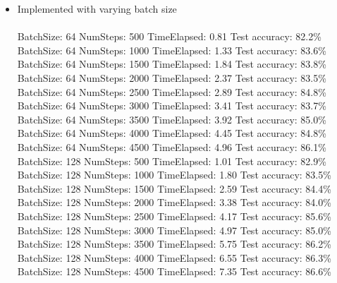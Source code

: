 \documentclass{article}
\begin{document}
\begin{itemize}
	\item Implemented with varying batch size \\ \\

BatchSize: 64 NumSteps: 500 TimeElapsed: 0.81 Test accuracy: 82.2\% \\
BatchSize: 64 NumSteps: 1000 TimeElapsed: 1.33 Test accuracy: 83.6\% \\
BatchSize: 64 NumSteps: 1500 TimeElapsed: 1.84 Test accuracy: 83.8\% \\
BatchSize: 64 NumSteps: 2000 TimeElapsed: 2.37 Test accuracy: 83.5\% \\
BatchSize: 64 NumSteps: 2500 TimeElapsed: 2.89 Test accuracy: 84.8\% \\
BatchSize: 64 NumSteps: 3000 TimeElapsed: 3.41 Test accuracy: 83.7\% \\
BatchSize: 64 NumSteps: 3500 TimeElapsed: 3.92 Test accuracy: 85.0\% \\
BatchSize: 64 NumSteps: 4000 TimeElapsed: 4.45 Test accuracy: 84.8\% \\
BatchSize: 64 NumSteps: 4500 TimeElapsed: 4.96 Test accuracy: 86.1\% \\

BatchSize: 128 NumSteps: 500 TimeElapsed: 1.01 Test accuracy: 82.9\% \\
BatchSize: 128 NumSteps: 1000 TimeElapsed: 1.80 Test accuracy: 83.5\% \\
BatchSize: 128 NumSteps: 1500 TimeElapsed: 2.59 Test accuracy: 84.4\% \\
BatchSize: 128 NumSteps: 2000 TimeElapsed: 3.38 Test accuracy: 84.0\% \\
BatchSize: 128 NumSteps: 2500 TimeElapsed: 4.17 Test accuracy: 85.6\% \\
BatchSize: 128 NumSteps: 3000 TimeElapsed: 4.97 Test accuracy: 85.0\% \\
BatchSize: 128 NumSteps: 3500 TimeElapsed: 5.75 Test accuracy: 86.2\% \\
BatchSize: 128 NumSteps: 4000 TimeElapsed: 6.55 Test accuracy: 86.3\% \\
BatchSize: 128 NumSteps: 4500 TimeElapsed: 7.35 Test accuracy: 86.6\% \\


\end{itemize}
\end{document}
